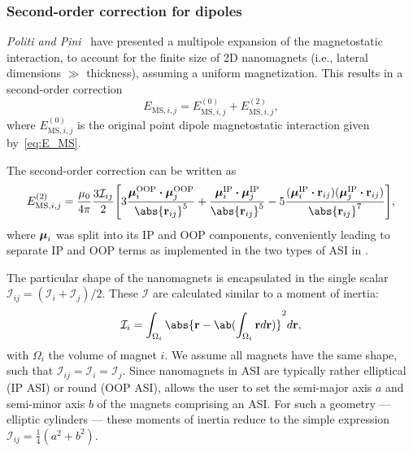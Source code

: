 \subsubsection{Second-order correction for dipoles}
\textit{Politi and Pini}~\cite{Dipolar2Dparticles} have presented a multipole expansion of the magnetostatic interaction, to account for the finite size of 2D nanomagnets (i.e., lateral dimensions $\gg$ thickness), assuming a uniform magnetization.
This results in a second-order correction
\begin{equation}
	E_{\mathrm{MS},i,j} = E_{\mathrm{MS},i,j}^\mathrm{(0)} + E_{\mathrm{MS},i,j}^\mathrm{(2)} \mathrm{,}
\end{equation}
where $E_{\mathrm{MS},i,j}^\mathrm{(0)}$ is the original point dipole magnetostatic interaction given by~\cref{eq:E_MS}. \par
The second-order correction can be written as
\begin{equation}
	E_{\mathrm{MS},i,j}^\mathrm{(2)} = \frac{\mu_0}{4\pi} \frac{3\mathcal{I}_{ij}}{2} \Bigg[3\frac{\vc{\mu}_i^\mathrm{OOP} \bcdot \vc{\mu}_j^\mathrm{OOP}}{\abs{\vc{r}_{ij}}^5} + \frac{\vc{\mu}_i^\mathrm{IP} \bcdot \vc{\mu}_j^\mathrm{IP}}{\abs{\vc{r}_{ij}}^5} -5\frac{(\vc{\mu}_i^\mathrm{IP} \bcdot \vc{r}_{ij}) (\vc{\mu}_j^\mathrm{IP} \bcdot \vc{r}_{ij})}{\abs{\vc{r}_{ij}}^7} \Bigg] \mathrm{,}
\end{equation}
where $\boldsymbol{\mathbf{\mu}}_i$ was split into its IP and OOP components, conveniently leading to separate IP and OOP terms as implemented in the two types of ASI in \hotspice. \par
The particular shape of the nanomagnets is encapsulated in the single scalar $\mathcal{I}_{ij} = (\mathcal{I}_i + \mathcal{I}_j)/2$.
These $\mathcal{I}$ are calculated similar to a moment of inertia:
\begin{equation}
	\mathcal{I}_i = \int_{\Omega_i} \abs{\vc{r} - \ab(\int_{\Omega_i} \vc{r} d\vc{r})}^2 d\vc{r} \mathrm{,}
\end{equation}
with $\Omega_i$ the volume of magnet $i$.
We assume all magnets have the same shape, such that $\mathcal{I}_{ij} = \mathcal{I}_i = \mathcal{I}_j$.
Since nanomagnets in ASI are typically rather elliptical (IP ASI) or round (OOP ASI), \hotspice allows the user to set the semi-major axis $a$ and semi-minor axis $b$ of the magnets comprising an ASI.
For such a geometry --- elliptic cylinders --- these moments of inertia reduce to the simple expression $\mathcal{I}_{ij} = \frac{1}{4}(a^2 + b^2)$. %

